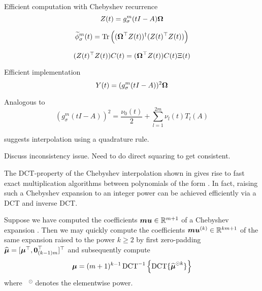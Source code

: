 Efficient computation with Chebyshev recurrence
\begin{equation}
    Z(t) = g_{\sigma}^m(tI - A) \boldsymbol{\Omega}
    \label{equ:3-nystrom-SS-Z}
\end{equation}

\begin{equation}
    \widetilde{\phi}_{\sigma}^m(t)
        = \operatorname{Tr}\left((\boldsymbol{\Omega}^{\top} Z(t))^{\dagger} (Z(t)^{\top} Z(t))\right)
    \label{equ:3-nystrom-SS-spectral-density}
\end{equation}

\begin{equation}
    (Z(t)^{\top} Z(t)) C(t) = (\boldsymbol{\Omega}^{\top} Z(t)) C(t) \Xi(t)
    \label{equ:3-nystrom-SS-generalized-eigenproblem}
\end{equation}

Efficient implementation
\begin{equation}
    Y(t) = (g_{\sigma}^m(tI - A))^2 \boldsymbol{\Omega}
    \label{equ:3-nystrom-SS-Y}
\end{equation}

Analogous to 
\begin{equation}
    (g_{\sigma}^m(tI - A))^2 = \frac{\nu_0(t)}{2} + \sum_{l=1}^{2m} \nu_l(t) T_l(A)
    \label{equ:3-nystrom-ESS-chebyshev-expansion}
\end{equation}

\cite{lin2017randomized} suggests interpolation using a quadrature rule.

Discuss inconsistency issue. Need to do direct squaring to get consistent.

The \gls{DCT}-property of the Chebyshev interpolation shown in 
gives rise to fast exact multiplication algorithms between polynomials
of the form  \cite[Proposition~3.1]{baszenski1997cosine}.
In fact, raising such a Chebyshev expansion to an integer power can be achieved
efficiently via a \gls{DCT} and inverse \gls{DCT}.

Suppose we have computed the coefficients $\boldsymbol{mu} \in \mathbb{R}^{m+1}$
of a Chebyshev expansion .
Then we may quickly compute the coefficients $\boldsymbol{mu}^{(k)} \in \mathbb{R}^{km+1}$
of the same expansion raised to the power $k \geq 2$ by first zero-padding
$\widehat{\boldsymbol{\mu}} = [\boldsymbol{\mu}^{\top}, \boldsymbol{0}_{(k-1)m}^{\top}]^{\top}$
and subsequently compute
\begin{equation}
    \boldsymbol{\mu} = (m+1)^{k - 1} \operatorname{DCT}^{-1}\left\{ \operatorname{DCT}\{\widehat{\boldsymbol{\mu}}^{\odot k}\} \right\}
    \label{equ:3-nystrom-ESS-square-coefficients}
\end{equation}
where $\phantom{x}^\odot$ denotes the elementwise power.

